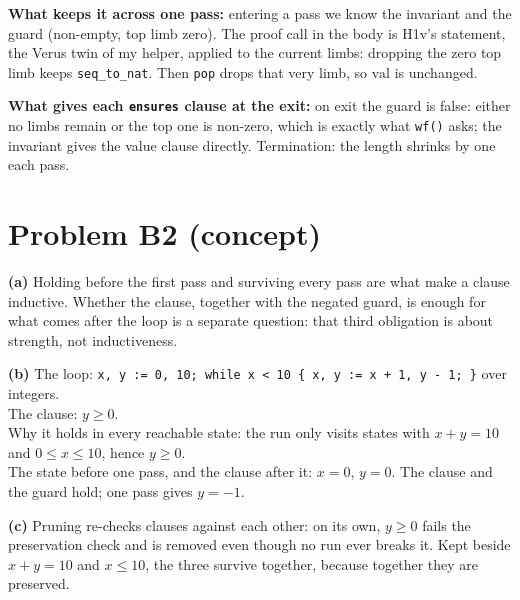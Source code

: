 \documentclass[11pt]{article}
\begin{document}
\begin{answer}
\textbf{What keeps it across one pass:} entering a pass we know the invariant and
the guard (non-empty, top limb zero). The proof call in the body is H1v's
statement, the Verus twin of my helper, applied to the current limbs: dropping
the zero top limb keeps \texttt{seq\_to\_nat}. Then \texttt{pop} drops that very
limb, so $\mathrm{val}$ is unchanged.

\textbf{What gives each \texttt{ensures} clause at the exit:} on exit the
guard is false: either no limbs remain or the top one is non-zero, which is
exactly what \texttt{wf()} asks; the invariant gives the value clause directly.
Termination: the length shrinks by one each pass.
\end{answer}

\section*{Problem B2 (concept)}\label{ans:B2}
\begin{answer}
\textbf{(a)} Holding before the first pass and surviving every pass are what
make a clause inductive. Whether the clause, together with the negated guard, is
enough for what comes after the loop is a separate question: that third
obligation is about strength, not inductiveness.

\textbf{(b)} The loop: \texttt{x, y := 0, 10; while x < 10 \{ x, y := x + 1, y - 1; \}}
over integers. \\
The clause: $y \geq 0$. \\
Why it holds in every reachable state: the run only visits states with
$x + y = 10$ and $0 \leq x \leq 10$, hence $y \geq 0$. \\
The state before one pass, and the clause after it: $x = 0$, $y = 0$. The clause
and the guard hold; one pass gives $y = -1$.

\textbf{(c)} Pruning re-checks clauses against each other: on its own,
$y \geq 0$ fails the preservation check and is removed even though no run ever
breaks it. Kept beside $x + y = 10$ and $x \leq 10$, the three survive together,
because together they are preserved.
\end{answer}

\end{document}
